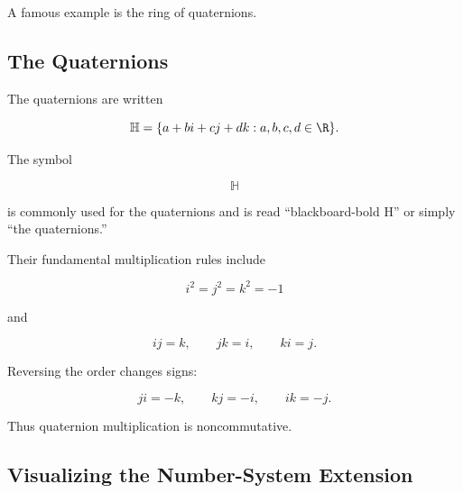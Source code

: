 A famous example is the ring of quaternions.

\subsection{The Quaternions}
\label{subsec:quaternions-ring}

The quaternions are written

\[ \mathbb{H}=\{a+bi+cj+dk:a,b,c,d\in\R\}. \]

The symbol

\[ \mathbb{H} \]

is commonly used for the quaternions and is read ``blackboard-bold H'' or
simply ``the quaternions.''

Their fundamental multiplication rules include

\[ i^2=j^2=k^2=-1 \]

and

\[ ij=k,\qquad jk=i,\qquad ki=j. \]

Reversing the order changes signs:

\[ ji=-k,\qquad kj=-i,\qquad ik=-j. \]

Thus quaternion multiplication is noncommutative.

\subsection{Visualizing the Number-System Extension}
\label{subsec:number-system-ring-extension}

\begin{center}
\end{center}

